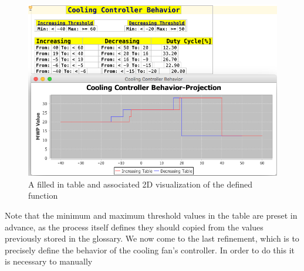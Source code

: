 % 
\begin{figure}[!h]
\centering
\includegraphics[width=.6\textwidth]{./figures/DiehlTableAnd2DGraph.png}
\vspace{-.3cm}
\caption{A filled in table and associated 2D visualization of the defined
function} 
\label{fig:FAU_behavior_2d}
 \vspace{-.7cm}
\end{figure}
Note that the minimum and maximum threshold values in the table are preset in
advance, as the process itself defines they should copied from the values
previously stored in the glossary.
We now come to the last refinement, which is to precisely define the behavior of
the cooling fan's controller. In order to do this it is necessary to manually

